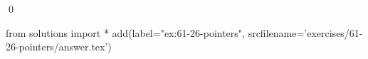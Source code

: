 
\begin{ex}
  \label{ex:61-26-pointers}
  
  \qed
\end{ex}
\begin{python0}
from solutions import *
add(label="ex:61-26-pointers",
    srcfilename='exercises/61-26-pointers/answer.tex')
\end{python0}
